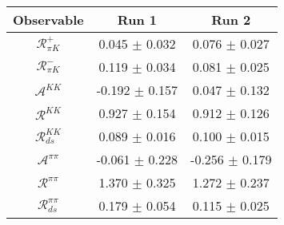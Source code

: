 \begin{tabular}{ccc}
Observable & Run 1 & Run 2 \\
\midrule
$\mathcal{R}_{\pi K}^+$ & 0.045 $\pm$ 0.032 & 0.076 $\pm$ 0.027 \\
$\mathcal{R}_{\pi K}^-$ & 0.119 $\pm$ 0.034 & 0.081 $\pm$ 0.025 \\
$\mathcal{A}^{KK}$ & -0.192 $\pm$ 0.157 & 0.047 $\pm$ 0.132 \\
$\mathcal{R}^{KK}$ & 0.927 $\pm$ 0.154 & 0.912 $\pm$ 0.126 \\
$\mathcal{R}_{ds}^{KK}$ & 0.089 $\pm$ 0.016 & 0.100 $\pm$ 0.015 \\
$\mathcal{A}^{\pi\pi}$ & -0.061 $\pm$ 0.228 & -0.256 $\pm$ 0.179 \\
$\mathcal{R}^{\pi\pi}$ & 1.370 $\pm$ 0.325 & 1.272 $\pm$ 0.237 \\
$\mathcal{R}_{ds}^{\pi\pi}$ & 0.179 $\pm$ 0.054 & 0.115 $\pm$ 0.025 \\
\end{tabular}
